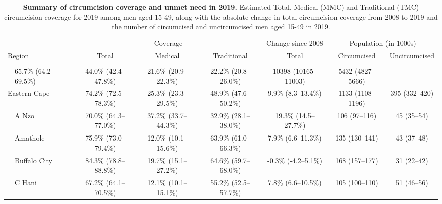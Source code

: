 \documentclass{article}
\begin{document}
\begin{landscape}

  {
  \linespread{1}
    \newpage
    \small
    \begin{longtable}[c]{llc cc ccc}
      \hline
      & & \multicolumn{3}{c}{Coverage} & Change since 2008 & \multicolumn{2}{c}{Population (in 1000s)}  \\[1pt]
      \cmidrule(lr){3-5}
      \cmidrule(lr){6-6}
      \cmidrule(lr){7-8}
      \multicolumn{2}{l}{Region} & Total  & Medical & Traditional & Total &  Circumcised & Uncircumcised \\[3pt]
      \hline
      \vspace{-5pt}
      \endhead
      \\[-5pt]\hline
      \caption{{\bf Summary of circumcision coverage and unmet need in 2019.} Estimated Total, Medical (MMC) and Traditional (TMC) circumcision coverage for 2019 among men aged 15-49, along with the absolute change in total circumcision coverage from 2008 to 2019 and the number of circumcised and uncircumcised men aged 15-49 in 2019.}
      \endfoot
      \multicolumn{2}{l}{South Africa} & 65.7\% (64.2--69.5\%) & 44.0\% (42.4--47.8\%) & 21.6\% (20.9--22.3\%) & 22.2\% (20.8--26.0\%) & 10398 (10165--11003) & 5432 (4827--5666) \\[5pt]
      \multicolumn{2}{l}{Eastern Cape}  & 74.2\% (72.5--78.3\%) & 25.3\% (23.3--29.5\%) & 48.9\% (47.6--50.2\%) & 9.9\% (8.3--13.4\%) & 1133 (1108--1196) & 395 (332--420) \\
      & A Nzo & 70.0\% (64.3--77.0\%) & 37.2\% (33.7--44.3\%) & 32.9\% (28.1--38.0\%) & 19.3\% (14.5--27.7\%) & 106 (97--116) & 45 (35--54) \\
      & Amathole & 75.9\% (73.0--79.4\%) & 12.0\% (10.1--15.6\%) & 63.9\% (61.0--66.3\%) & 7.9\% (6.6--11.3\%) & 135 (130--141) & 43 (37--48) \\
      & Buffalo City & 84.3\% (78.8--88.8\%) & 19.7\% (15.1--27.2\%) & 64.6\% (59.7--68.0\%) & -0.3\% (-4.2--5.1\%) & 168 (157--177) & 31 (22--42) \\
      & C Hani & 67.2\% (64.1--70.5\%) & 12.1\% (10.1--15.1\%) & 55.2\% (52.5--57.7\%) & 7.8\% (6.6--10.5\%) & 105 (100--110) & 51 (46--56) \\

\end{longtable}}
\end{landscape}
\end{document}
